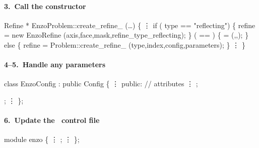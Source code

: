 \begin{frame}[fragile] 
\secframetitle{\ssAddRefine}
\framesubtitle{3.~Call the  constructor}

\footnotesize
\begin{semiverbatim}
   Refine * EnzoProblem::create_refine_ (\dots)
   \{
         \vdots
   if (       type == "reflecting") \{ 
      refine = new EnzoRefine 
         (axis,face,mask,refine_type_reflecting);
   \}  ( == ) \{
       =   (,,);
   \} else \{
      refine = Problem::create_refine_
         (type,index,config,parameters);
   \}
         \vdots
   \}
\end{semiverbatim}

\end{frame}


\begin{frame}[fragile] 
\secframetitle{\ssAddRefine}
\framesubtitle{4--5.~Handle any parameters}

\footnotesize
\begin{semiverbatim}
   class EnzoConfig : public Config \{ 
        \vdots
      public: // attributes 
        \vdots 
       ;

      ;
        \vdots 
   \};
\end{semiverbatim}

\end{frame}


\begin{frame}[fragile] 
\secframetitle{\ssAddRefine}
\framesubtitle{6.~Update the \charm\ control file }

\footnotesize
\begin{semiverbatim}
   module enzo \{
       \vdots
       ;
       \vdots
   \};
\end{semiverbatim}
\end{frame}


